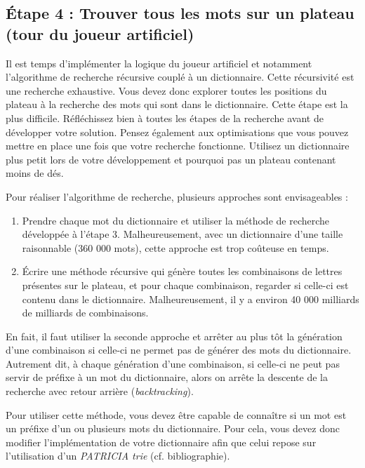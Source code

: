 \documentclass[10pt]{article}
\begin{document}
\subsection*{\'Etape 4 : Trouver tous les mots sur un plateau (tour du joueur artificiel)}

Il est temps d'implémenter la logique du joueur artificiel et notamment
l'algorithme de recherche récursive couplé à un dictionnaire. Cette
récursivité est une recherche exhaustive. Vous devez donc explorer toutes les
positions du plateau à la recherche des mots qui sont dans le dictionnaire.
Cette étape est la plus difficile. Réfléchissez bien à toutes les étapes de la
recherche avant de développer votre solution. Pensez également aux
optimisations que vous pouvez mettre en place une fois que votre recherche
fonctionne. Utilisez un dictionnaire plus petit lors de votre développement et
pourquoi pas un plateau contenant moins de dés.

Pour réaliser l'algorithme de recherche, plusieurs approches sont
envisageables :

\begin{enumerate}

\item Prendre chaque mot du dictionnaire et utiliser la méthode de recherche
développée à l'étape 3. Malheureusement, avec un dictionnaire d'une taille
raisonnable (360 000 mots), cette approche est trop coûteuse en temps.

\item \'Ecrire une méthode récursive qui génère toutes les combinaisons de
lettres présentes sur le plateau, et pour chaque combinaison, regarder si
celle-ci est contenu dans le dictionnaire. Malheureusement, il y a environ 40
000 milliards de milliards de combinaisons.

\end{enumerate}

En fait, il faut utiliser la seconde approche et arrêter au plus tôt la
génération d'une combinaison si celle-ci ne permet pas de générer des mots du
dictionnaire. Autrement dit, à chaque génération d'une combinaison, si
celle-ci ne peut pas servir de préfixe à un mot du dictionnaire, alors on
arrête la descente de la recherche avec retour arrière (\emph{backtracking}).

Pour utiliser cette méthode, vous devez être capable de connaître si un mot
est un préfixe d'un ou plusieurs mots du dictionnaire. Pour cela, vous devez
donc modifier l'implémentation de votre dictionnaire afin que celui repose
sur l'utilisation d'un \emph{PATRICIA trie} (cf. bibliographie).
\end{document}
